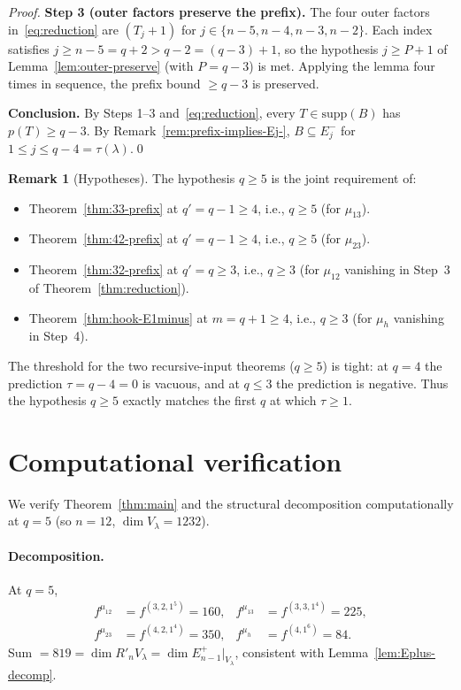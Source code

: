 \documentclass[11pt]{article}
\theoremstyle{definition}
\newtheorem{remark}[theorem]{Remark}
\newcommand{\supp}{\mathrm{supp}}
\newcommand{\Rp}{{R'}}
\begin{document}
\begin{proof}
\medskip\textbf{Step 3 (outer factors preserve the prefix).}
The four outer factors in~\eqref{eq:reduction} are $(T_j{+}1)$ for
$j \in \{n-5, n-4, n-3, n-2\}$.  Each index satisfies $j \ge n - 5
= q + 2 > q - 2 = (q - 3) + 1$, so the hypothesis $j \ge P + 1$ of
Lemma~\ref{lem:outer-preserve} (with $P = q - 3$) is met.  Applying
the lemma four times in sequence, the prefix bound $\ge q - 3$ is
preserved.

\medskip\textbf{Conclusion.}  By Steps 1--3 and~\eqref{eq:reduction},
every $T \in \supp(B)$ has $p(T) \ge q - 3$.  By
Remark~\ref{rem:prefix-implies-Ej-}, $B \subseteq E_j^-$ for $1 \le
j \le q - 4 = \tau(\lambda)$.\qed
\end{proof}

\begin{remark}[Hypotheses]\label{rem:hyp}
The hypothesis $q \ge 5$ is the joint requirement of:
\begin{itemize}[topsep=0.2em,itemsep=0.1em]
\item Theorem~\ref{thm:33-prefix} at $q' = q - 1 \ge 4$, i.e., $q \ge 5$
(for $\mu_{13}$).
\item Theorem~\ref{thm:42-prefix} at $q' = q - 1 \ge 4$, i.e., $q \ge 5$
(for $\mu_{23}$).
\item Theorem~\ref{thm:32-prefix} at $q' = q \ge 3$, i.e., $q \ge 3$
(for $\mu_{12}$ vanishing in Step~3 of Theorem~\ref{thm:reduction}).
\item Theorem~\ref{thm:hook-E1minus} at $m = q + 1 \ge 4$, i.e., $q \ge 3$
(for $\mu_h$ vanishing in Step~4).
\end{itemize}
The threshold for the two recursive-input theorems ($q \ge 5$) is
tight: at $q = 4$ the prediction $\tau = q - 4 = 0$ is vacuous, and at
$q \le 3$ the prediction is negative.  Thus the hypothesis $q \ge 5$
exactly matches the first $q$ at which $\tau \ge 1$.
\end{remark}

\section{Computational verification}\label{sec:verify}

We verify Theorem~\ref{thm:main} and the structural decomposition
computationally at $q = 5$ (so $n = 12$, $\dim V_\lambda = 1232$).

\paragraph{Decomposition.}  At $q = 5$,
\begin{align*}
   f^{\mu_{12}} &= f^{(3,2,1^5)} = 160, &
   f^{\mu_{13}} &= f^{(3,3,1^4)} = 225, \\
   f^{\mu_{23}} &= f^{(4,2,1^4)} = 350, &
   f^{\mu_h} &= f^{(4,1^6)} = 84.
\end{align*}
Sum $= 819 = \dim \Rp_n V_\lambda = \dim E_{n-1}^+|_{V_\lambda}$,
consistent with Lemma~\ref{lem:Eplus-decomp}.
\end{document}
